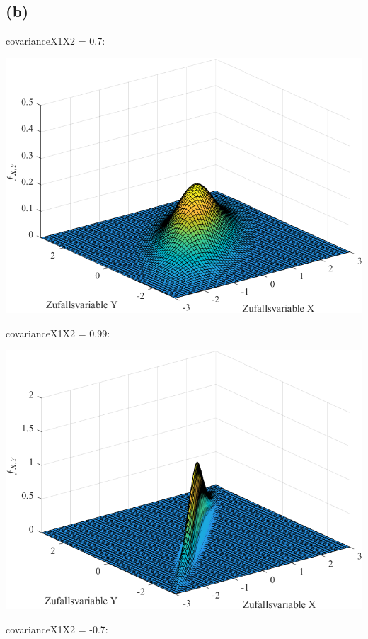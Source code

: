 \documentclass[a4paper]{scrartcl}
\begin{document}
\subsection*{(b)} %

covarianceX1X2 = 0.7:
\begin{center}
	\includegraphics*[scale = 0.5]{question3b1.png}
\end{center}
covarianceX1X2 = 0.99:
\begin{center}
	\includegraphics*[scale = 0.5]{question3b2.png}
\end{center}
covarianceX1X2 = -0.7:
\end{document}
